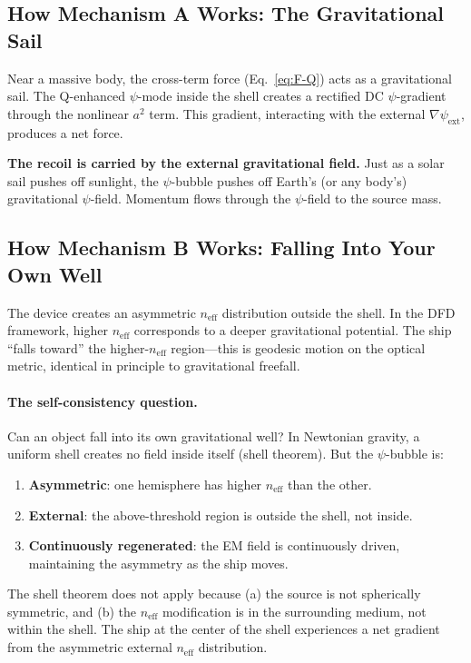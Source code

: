 \documentclass[12pt,aps,prd,superscriptaddress,nofootinbib,longbibliography]{revtex4-2}
\newcommand{\neff}{n_{\mathrm{eff}}}
\begin{document}
\subsection{How Mechanism A Works: The Gravitational Sail}

Near a massive body, the cross-term force (Eq.~\ref{eq:F-Q}) acts as a
gravitational sail.  The Q-enhanced $\psi$-mode inside the shell creates
a rectified DC $\psi$-gradient through the nonlinear $a^2$ term.  This
gradient, interacting with the external $\nabla\psi_{\mathrm{ext}}$,
produces a net force.

\textbf{The recoil is carried by the external gravitational field.}
Just as a solar sail pushes off sunlight, the $\psi$-bubble pushes off
Earth's (or any body's) gravitational $\psi$-field.  Momentum flows
through the $\psi$-field to the source mass.

\subsection{How Mechanism B Works: Falling Into Your Own Well}

The device creates an asymmetric $\neff$ distribution outside the shell.
In the DFD framework, higher $\neff$ corresponds to a deeper gravitational
potential.  The ship ``falls toward'' the higher-$\neff$ region---this is
geodesic motion on the optical metric, identical in principle to
gravitational freefall.

\paragraph{The self-consistency question.}
Can an object fall into its own gravitational well?  In Newtonian gravity,
a uniform shell creates no field inside itself (shell theorem).  But the
$\psi$-bubble is:
\begin{enumerate}
\item \textbf{Asymmetric}: one hemisphere has higher $\neff$ than the other.
\item \textbf{External}: the above-threshold region is outside the shell,
not inside.
\item \textbf{Continuously regenerated}: the EM field is continuously
driven, maintaining the asymmetry as the ship moves.
\end{enumerate}

The shell theorem does not apply because (a) the source is not spherically
symmetric, and (b) the $\neff$ modification is in the surrounding medium,
not within the shell.  The ship at the center of the shell experiences a
net gradient from the asymmetric external $\neff$ distribution.
\end{document}

